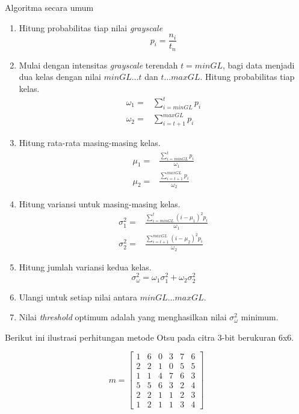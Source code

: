 \documentclass[laporan.tex]{subfiles}
\begin{document}
Algoritma secara umum
\begin{enumerate}
\item Hitung probabilitas tiap nilai \emph{grayscale}
\begin{equation}
	p_i = \frac{n_i}{t_n}
\end{equation}
\item Mulai dengan intensitas \emph{grayscale} terendah $t=minGL$, bagi data menjadi dua kelas dengan nilai $minGL \ldots t$ dan $t \ldots maxGL$. Hitung probabilitas tiap kelas.
\begin{align}
	\omega_1 = & \sum_{i=minGL}^t p_i \\
	\omega_2 = & \sum_{i=t+1}^{maxGL} p_i
\end{align}
\item Hitung rata-rata masing-masing kelas.
\begin{align}
	\mu_1 = & \frac{\sum_{i=minGL}^t p_i}{\omega_1} \\
	\mu_2 = & \frac{\sum_{i=t+1}^{maxGL} p_i}{\omega_2}
\end{align}
\item Hitung variansi untuk masing-masing kelas.
\begin{align}
	\sigma_1^2 = & \frac{\sum_{i=minGL}^t (i - \mu_1)^2 p_i}{\omega_1} \\
	\sigma_2^2 = & \frac{\sum_{i=t+1}^{maxGL} (i - \mu_2)^2 p_i}{\omega_2}
\end{align}
\item Hitung jumlah variansi kedua kelas.
\begin{equation}
	\sigma_{\omega}^2 = \omega_1 \sigma_1^2 + \omega_2 \sigma_2^2
\end{equation}
\item Ulangi untuk setiap nilai antara $minGL \ldots maxGL$.
\item Nilai \emph{threshold} optimum adalah yang menghasilkan nilai $\sigma_{\omega}^2$ minimum.
\end{enumerate}

Berikut ini ilustrasi perhitungan metode Otsu pada citra 3-bit berukuran 6x6.

\begin{equation*}
	m = \begin{bmatrix}
		1 & 6 & 0 & 3 & 7 & 6 \\
		2 & 2 & 1 & 0 & 5 & 5 \\
		1 & 1 & 4 & 7 & 6 & 3 \\
		5 & 5 & 6 & 3 & 2 & 4 \\
		2 & 2 & 1 & 1 & 2 & 3 \\
		1 & 2 & 1 & 1 & 3 & 4
	\end{bmatrix}
\end{equation*}
\end{document}
